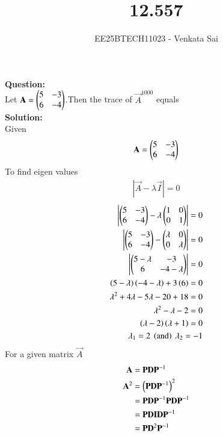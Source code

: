 \documentclass[journal]{IEEEtran}
\begin{document}


\title{12.557}
\author{EE25BTECH11023 - Venkata Sai}
\maketitle 
\renewcommand{\thefigure}{\theenumi}
\renewcommand{\thetable}{\theenumi}
\setlength{\intextsep}{10pt} %

\renewcommand{\thetable}{\theenumi}
\vspace{-1em}
\textbf{Question:}  \\
Let $\mathbf{A}=\begin{pmatrix}5&-3\\6&-4\end{pmatrix}$.Then the trace of $\vec{A}^{1000}$ equals\\
\textbf{Solution:}  \\
  Given
  \begin{align}
      \mathbf{A}=\begin{pmatrix}5&-3\\6&-4\end{pmatrix} \\
  \end{align}
  To find eigen values 
  \begin{align}
      |\vec{A}-\lambda\vec{I}|=0
      \end{align}
      \begin{align}
            \begin{vmatrix}\begin{pmatrix}5&-3\\6&-4\end{pmatrix}-\lambda\begin{pmatrix}1&0\\0&1\end{pmatrix}\end{vmatrix}=0\\
            \begin{vmatrix}\begin{pmatrix}5&-3\\6&-4\end{pmatrix}-\begin{pmatrix}\lambda&0\\0&\lambda\end{pmatrix}\end{vmatrix}=0\\
            \begin{vmatrix}\begin{pmatrix}5-\lambda&-3\\6&-4-\lambda\end{pmatrix}\end{vmatrix}=0 \\
            \left(5-\lambda\right)\left(-4-\lambda\right)+3\left(6\right)=0\\
            \lambda^2+4\lambda-5\lambda-20+18=0 \\
            \lambda^2-\lambda-2=0 \\
            \left(\lambda-2\right)\left(\lambda+1\right)=0 \\
            \lambda_1=2\ \left(\text{and}\right)\ \lambda_2=-1
  \end{align}
For a given matrix $\vec{A}$
\begin{align}
     \mathbf{A}&=\mathbf{P}\mathbf{D}\mathbf{P}^{-1} \\
      \mathbf{A}^2&=\left(\mathbf{P}\mathbf{D}\mathbf{P}^{-1}\right)^2 \\
      &=\mathbf{P}\mathbf{D}\mathbf{P}^{-1}\mathbf{P}\mathbf{D}\mathbf{P}^{-1}\\
      &=\mathbf{P}\mathbf{D}\mathbf{I}\mathbf{D}\mathbf{P}^{-1}\\
      &=\mathbf{P}\mathbf{D}^2\mathbf{P}^{-1}
 \end{align}
\end{document}
